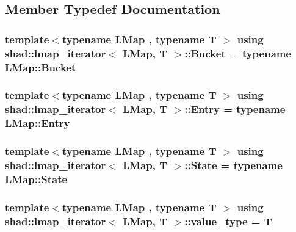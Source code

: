 \subsection{Member Typedef Documentation}
\hypertarget{classshad_1_1lmap__iterator_aa37c8a6e06e10d9256e3ce2be6fabb4a}{
\subsubsection[{Bucket}]{\setlength{\rightskip}{0pt plus 5cm}template$<$typename L\-Map , typename T $>$ using {\bf shad\-::lmap\-\_\-iterator}$<$ L\-Map, T $>$\-::{\bf Bucket} =  typename L\-Map\-::\-Bucket}}\label{classshad_1_1lmap__iterator_aa37c8a6e06e10d9256e3ce2be6fabb4a}
\hypertarget{classshad_1_1lmap__iterator_a67f31795cef049e504582e3ec92232ba}{
\subsubsection[{Entry}]{\setlength{\rightskip}{0pt plus 5cm}template$<$typename L\-Map , typename T $>$ using {\bf shad\-::lmap\-\_\-iterator}$<$ L\-Map, T $>$\-::{\bf Entry} =  typename L\-Map\-::\-Entry}}\label{classshad_1_1lmap__iterator_a67f31795cef049e504582e3ec92232ba}
\hypertarget{classshad_1_1lmap__iterator_a21e8efc8bee9e50f89cd3c17a0c18673}{
\subsubsection[{State}]{\setlength{\rightskip}{0pt plus 5cm}template$<$typename L\-Map , typename T $>$ using {\bf shad\-::lmap\-\_\-iterator}$<$ L\-Map, T $>$\-::{\bf State} =  typename L\-Map\-::\-State}}\label{classshad_1_1lmap__iterator_a21e8efc8bee9e50f89cd3c17a0c18673}
\hypertarget{classshad_1_1lmap__iterator_a5aaca46b07b8669790d0134b6f4a9f97}{
\subsubsection[{value\-\_\-type}]{\setlength{\rightskip}{0pt plus 5cm}template$<$typename L\-Map , typename T $>$ using {\bf shad\-::lmap\-\_\-iterator}$<$ L\-Map, T $>$\-::{\bf value\-\_\-type} =  T}}\label{classshad_1_1lmap__iterator_a5aaca46b07b8669790d0134b6f4a9f97}


